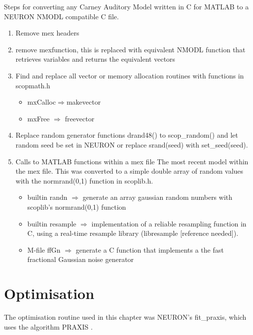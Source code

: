 Steps for converting any Carney Auditory Model written in C for MATLAB to a
NEURON NMODL compatible C file.
\begin{enumerate} 
\item Remove mex headers 
\item remove \textsf{mexfunction}, this is replaced with equivalent NMODL
  function that retrieves variables and returns the equivalent vectors
\item Find and replace all vector or memory allocation routines with functions
  in scopmath.h
\begin{itemize} 
\item \textsf{mxCalloc}$\Rightarrow$\textsf{makevector}
\item \textsf{mxFree} $\Rightarrow$ \textsf{freevector}
\end{itemize} 
\item Replace random generator functions \textsf{drand48()} to
  \mbox{\textsf{scop\_random()}} and let random seed be set in NEURON or replace
  \textsf{srand(seed)} with \mbox{\textsf{set\_seed(seed)}}.
\item Calls to MATLAB functions within a mex file The most recent model within
  the mex file.  This was converted to a simple double array of random values
  with the \mbox{\textsf{normrand(0,1)}} function in \mbox{\textsf{scoplib.h}}.
  \begin{itemize}
  \item builtin \textsf{randn} $\Rightarrow$ generate an array gaussian random
    numbers with scoplib's \mbox{\textsf{normrand(0,1)}} function
  \item builtin \textsf{resample} $\Rightarrow$ implementation of a reliable
    resampling function in C, using a real-time resample library (libresample
    [reference needed]).
  \item M-file \textsf{ffGn} $\Rightarrow$ generate a C function that implements
    a the fast fractional Gaussian noise generator
  \end{itemize}

\end{enumerate}


\section{Optimisation}

The optimisation routine used in this chapter was NEURON's \textsf{fit\_praxis},
which uses the algorithm PRAXIS \citep{Brent:1976}.

